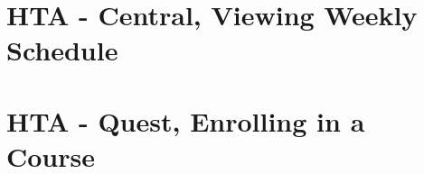 \documentclass[10pt]{article}
\begin{document}
\section*{HTA - Central, Viewing Weekly Schedule}
\begin{center}
\end{center}

\section*{HTA - Quest, Enrolling in a Course}
\begin{center}
\end{center}
\end{document}
